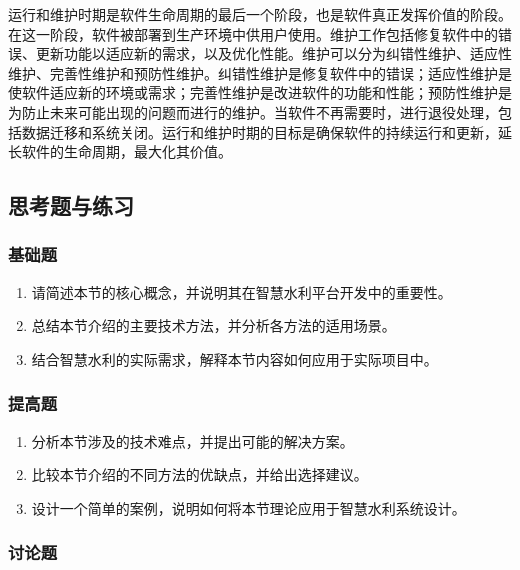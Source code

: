 运行和维护时期是软件生命周期的最后一个阶段，也是软件真正发挥价值的阶段。在这一阶段，软件被部署到生产环境中供用户使用。维护工作包括修复软件中的错误、更新功能以适应新的需求，以及优化性能。维护可以分为纠错性维护、适应性维护、完善性维护和预防性维护。纠错性维护是修复软件中的错误；适应性维护是使软件适应新的环境或需求；完善性维护是改进软件的功能和性能；预防性维护是为防止未来可能出现的问题而进行的维护。当软件不再需要时，进行退役处理，包括数据迁移和系统关闭。运行和维护时期的目标是确保软件的持续运行和更新，延长软件的生命周期，最大化其价值。

\hypertarget{ux601dux8003ux9898ux4e0eux7ec3ux4e60}{%
\subsection{思考题与练习}\label{ux601dux8003ux9898ux4e0eux7ec3ux4e60}}

\hypertarget{ux57faux7840ux9898}{%
\subsubsection{基础题}\label{ux57faux7840ux9898}}

\begin{enumerate}
\def\labelenumi{\arabic{enumi}.}
\tightlist
\item
  请简述本节的核心概念，并说明其在智慧水利平台开发中的重要性。
\item
  总结本节介绍的主要技术方法，并分析各方法的适用场景。
\item
  结合智慧水利的实际需求，解释本节内容如何应用于实际项目中。
\end{enumerate}

\hypertarget{ux63d0ux9ad8ux9898}{%
\subsubsection{提高题}\label{ux63d0ux9ad8ux9898}}

\begin{enumerate}
\def\labelenumi{\arabic{enumi}.}
\tightlist
\item
  分析本节涉及的技术难点，并提出可能的解决方案。
\item
  比较本节介绍的不同方法的优缺点，并给出选择建议。
\item
  设计一个简单的案例，说明如何将本节理论应用于智慧水利系统设计。
\end{enumerate}

\hypertarget{ux8ba8ux8bbaux9898}{%
\subsubsection{讨论题}\label{ux8ba8ux8bbaux9898}}

